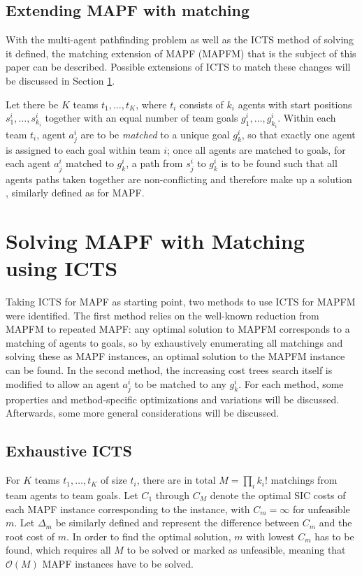 \documentclass[english]{article}
\begin{document}
	\subsection{Extending MAPF with matching}
	With the multi-agent pathfinding problem as well as the ICTS method of solving it defined, the matching extension of MAPF (MAPFM) that is the subject of this paper can be described. Possible extensions of ICTS to match these changes will be discussed in Section \ref{section:icts-matching}.
	
	Let there be $K$ teams $t_1,\ldots, t_K$, where $t_i$ consists of $k_i$ agents with start positions $s_1^i,\ldots,s_{k_i}^i$ together with an equal number of team goals $g_1^i,\ldots,g_{k_i}^i$. Within each team $t_i$, agent $a_j^i$ are to be \textit{matched} to a unique goal $g_k^i$, so that exactly one agent is assigned to each goal within team $i$; once all agents are matched to goals, for each agent $a_j^i$ matched to $g_k^i$, a path from $s_j^i$ to $g_k^i$ is to be found such that all agents paths taken together are non-conflicting and therefore make up a solution \cite{ma2016}, similarly defined as for MAPF.
	

%
	\section{Solving MAPF with Matching using ICTS} %
	\label{section:icts-matching}
	Taking ICTS for MAPF as starting point, two methods to use ICTS for MAPFM were identified. The first method relies on the well-known reduction from MAPFM to repeated MAPF: any optimal solution to MAPFM corresponds to a matching of agents to goals, so by exhaustively enumerating all matchings and solving these as MAPF instances, an optimal solution to the MAPFM instance can be found. In the second method, the increasing cost trees search itself is modified to allow an agent $a_j^i$ to be matched to any $g_k^i$. For each method, some properties and method-specific optimizations and variations will be discussed. Afterwards, some more general considerations will be discussed.
	\subsection{Exhaustive ICTS}
	For $K$ teams $t_1,\ldots,t_K$ of size $t_i$, there are in total $M = \prod_{i} k_i!$ matchings from team agents to team goals. Let $C_1$ through $C_M$ denote the optimal SIC costs of each MAPF instance corresponding to the instance, with $C_m = \infty$ for unfeasible $m$. Let $\Delta_m$ be similarly defined and represent the difference between $C_m$ and the root cost of $m$. In order to find the optimal solution, $m$ with lowest $C_m$ has to be found, which requires all $M$ to be solved or marked as unfeasible, meaning that $\mathcal{O}(M)$ MAPF instances have to be solved. 
	
\end{document}
